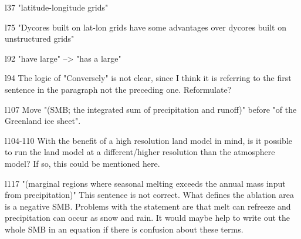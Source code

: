 \documentclass[12pt,oneside,a4paper]{article}%
\begin{document}
{\color{blue}{Done.}} \newline

l37 "latitude-longitude grids" \newline

{\color{blue}{Done.}} \newline

l75 "Dycores built on lat-lon grids have some advantages over dycores built on unstructured grids" \newline

{\color{blue}{Done.}} \newline

l92 "have large" --> "has a large" \newline

{\color{blue}{Done.}} \newline

l94 The logic of "Conversely" is not clear, since I think it is referring to the first sentence in the paragraph not the preceding one. Reformulate? \newline

{\color{blue}{Sentence beginning with conversely has been reformulated to improve clarity.}} \newline

l107 Move "(SMB; the integrated sum of precipitation and runoff)" before "of the Greenland ice sheet". \newline

{\color{blue}{Done.}} \newline

l104-110 With the benefit of a high resolution land model in mind, is it possible to run the land model at a different/higher resolution than the atmosphere model? If so, this could be mentioned here. \newline

{\color{blue}{As discussed above, I'm not optimistic about the utility of a higher-res land model, and would rather not go on a tangent about custom configurations.}} \newline

l117 "(marginal regions where seasonal melting exceeds the annual mass input from precipitation)" This sentence is not correct. What defines the ablation area is a negative SMB. Problems with the statement are that melt can refreeze and precipitation can occur as snow and rain. It would maybe help to write out the whole SMB in an equation if there is confusion about these terms. \newline
\end{document}
